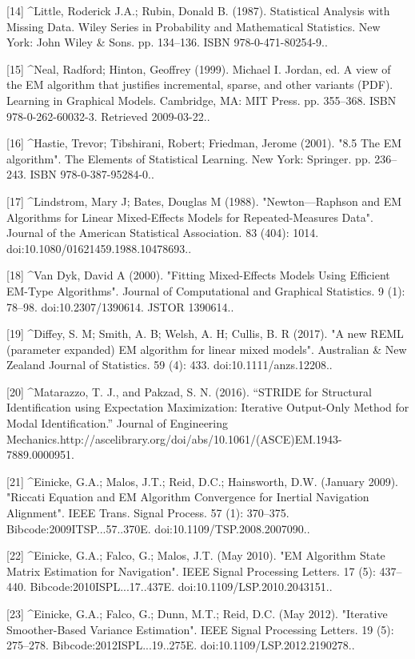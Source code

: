 [14]
^Little, Roderick J.A.; Rubin, Donald B. (1987). Statistical Analysis with Missing Data. Wiley Series in Probability and Mathematical Statistics. New York: John Wiley & Sons. pp. 134–136. ISBN 978-0-471-80254-9..

[15]
^Neal, Radford; Hinton, Geoffrey (1999). Michael I. Jordan, ed. A view of the EM algorithm that justifies incremental, sparse, and other variants (PDF). Learning in Graphical Models. Cambridge, MA: MIT Press. pp. 355–368. ISBN 978-0-262-60032-3. Retrieved 2009-03-22..

[16]
^Hastie, Trevor; Tibshirani, Robert; Friedman, Jerome (2001). "8.5 The EM algorithm". The Elements of Statistical Learning. New York: Springer. pp. 236–243. ISBN 978-0-387-95284-0..

[17]
^Lindstrom, Mary J; Bates, Douglas M (1988). "Newton—Raphson and EM Algorithms for Linear Mixed-Effects Models for Repeated-Measures Data". Journal of the American Statistical Association. 83 (404): 1014. doi:10.1080/01621459.1988.10478693..

[18]
^Van Dyk, David A (2000). "Fitting Mixed-Effects Models Using Efficient EM-Type Algorithms". Journal of Computational and Graphical Statistics. 9 (1): 78–98. doi:10.2307/1390614. JSTOR 1390614..

[19]
^Diffey, S. M; Smith, A. B; Welsh, A. H; Cullis, B. R (2017). "A new REML (parameter expanded) EM algorithm for linear mixed models". Australian & New Zealand Journal of Statistics. 59 (4): 433. doi:10.1111/anzs.12208..

[20]
^Matarazzo, T. J., and Pakzad, S. N. (2016). “STRIDE for Structural Identification using Expectation Maximization: Iterative Output-Only Method for Modal Identification.” Journal of Engineering Mechanics.http://ascelibrary.org/doi/abs/10.1061/(ASCE)EM.1943-7889.0000951.

[21]
^Einicke, G.A.; Malos, J.T.; Reid, D.C.; Hainsworth, D.W. (January 2009). "Riccati Equation and EM Algorithm Convergence for Inertial Navigation Alignment". IEEE Trans. Signal Process. 57 (1): 370–375. Bibcode:2009ITSP...57..370E. doi:10.1109/TSP.2008.2007090..

[22]
^Einicke, G.A.; Falco, G.; Malos, J.T. (May 2010). "EM Algorithm State Matrix Estimation for Navigation". IEEE Signal Processing Letters. 17 (5): 437–440. Bibcode:2010ISPL...17..437E. doi:10.1109/LSP.2010.2043151..

[23]
^Einicke, G.A.; Falco, G.; Dunn, M.T.; Reid, D.C. (May 2012). "Iterative Smoother-Based Variance Estimation". IEEE Signal Processing Letters. 19 (5): 275–278. Bibcode:2012ISPL...19..275E. doi:10.1109/LSP.2012.2190278..

